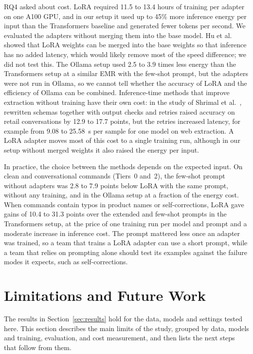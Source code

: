 \documentclass[journal,article,submit,pdftex,moreauthors]{Definitions/mdpi}
\begin{document}
RQ4 asked about cost. LoRA required 11.5 to 13.4 hours of training per adapter on one A100 GPU, and in our setup it used up to 45\% more inference energy per input than the Transformers baseline and generated fewer tokens per second. We evaluated the adapters without merging them into the base model. Hu et al.~\citep{hu2022lora} showed that LoRA weights can be merged into the base weights so that inference has no added latency, which would likely remove most of the speed difference; we did not test this. The Ollama setup used 2.5 to 3.9 times less energy than the Transformers setup at a similar EMR with the few-shot prompt, but the adapters were not run in Ollama, so we cannot tell whether the accuracy of LoRA and the efficiency of Ollama can be combined. Inference-time methods that improve extraction without training have their own cost: in the study of Shrimal et al.~\citep{shrimal2025parse}, rewritten schemas together with output checks and retries raised accuracy on retail conversations by 12.9 to 17.7 points, but the retries increased latency, for example from 9.08 to 25.58~s per sample for one model on web extraction. A LoRA adapter moves most of this cost to a single training run, although in our setup without merged weights it also raised the energy per input.

In practice, the choice between the methods depends on the expected input. On clean and conversational commands (Tiers~0 and~2), the few-shot prompt without adapters was 2.8 to 7.9 points below LoRA with the same prompt, without any training, and in the Ollama setup at a fraction of the energy cost. When commands contain typos in product names or self-corrections, LoRA gave gains of 10.4 to 31.3 points over the extended and few-shot prompts in the Transformers setup, at the price of one training run per model and prompt and a moderate increase in inference cost. The prompt mattered less once an adapter was trained, so a team that trains a LoRA adapter can use a short prompt, while a team that relies on prompting alone should test its examples against the failure modes it expects, such as self-corrections.

\section{Limitations and Future Work}\label{sec:limitations}

The results in Section~\ref{sec:results} hold for the data, models and settings tested here. This section describes the main limits of the study, grouped by data, models and training, evaluation, and cost measurement, and then lists the next steps that follow from them.
\end{document}
